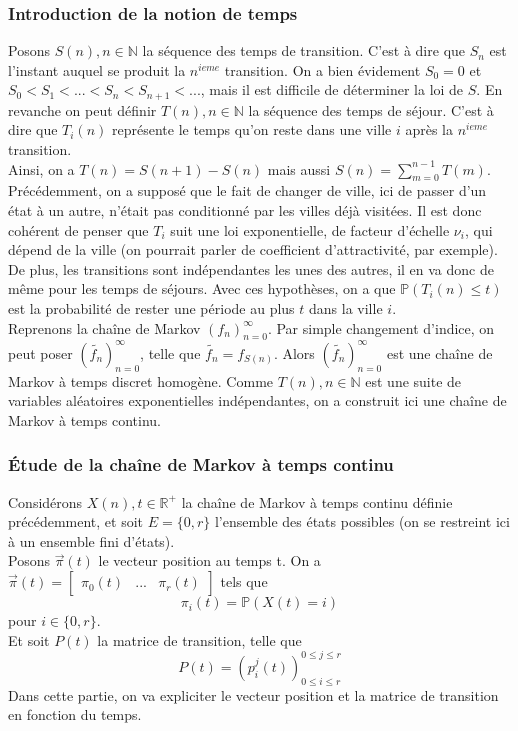 \documentclass[a4paper]{article}
\theoremstyle{plain}
\theoremstyle{definition}
\theoremstyle{remark}
\begin{document}
\subsubsection{Introduction de la notion de temps}
Posons ${S(n), n\in\mathbb{N}}$ la séquence des temps de transition. C'est à dire que $S_n$ est l'instant auquel se produit la $n^{ieme}$ transition. On a bien évidement $S_0=0$ et $S_0<S_1<...<S_n<S_{n+1}<...$, mais il est difficile de déterminer la loi de $S$. En revanche on peut définir ${T(n), n\in\mathbb{N}}$ la séquence des temps de séjour. C'est à dire que $T_i(n)$ représente le temps qu'on reste dans une ville $i$ après la $n^{ieme}$ transition.\\
Ainsi, on a $T(n)=S(n+1)-S(n)$ mais aussi $S(n)=\sum_{m=0}^{n-1}T(m)$.\\
Précédemment, on a supposé que le fait de changer de ville, ici de passer d'un état à un autre, n'était pas conditionné par les villes déjà visitées. Il est donc cohérent de penser que $T_i$ suit une loi exponentielle, de facteur d'échelle $\nu_i$, qui dépend de la ville (on pourrait parler de coefficient d'attractivité, par exemple).\\
De plus, les transitions sont indépendantes les unes des autres, il en va donc de même pour les temps de séjours.
Avec ces hypothèses, on a que $\mathbb{P}(T_i(n)\leqslant t)$ est la probabilité de rester une période au plus $t$ dans la ville $i$.\\
Reprenons la chaîne de Markov $(f_n)_{n=0}^{\infty}$. Par simple changement d'indice, on peut poser $(\tilde{f_n})_{n=0}^{\infty}$, telle que $\tilde{f_n}=f_{S(n)}$. Alors $(\tilde{f_n})_{n=0}^{\infty}$ est une chaîne de Markov à temps discret homogène. Comme ${T(n), n\in\mathbb{N}}$ est une suite de variables aléatoires exponentielles indépendantes, on a construit ici une chaîne de Markov à temps continu.
\subsubsection{Étude de la chaîne de Markov à temps continu}
Considérons ${X(n), t\in\mathbb{R}^+}$ la chaîne de Markov à temps continu définie précédemment, et soit $E=\{0,r\}$ l'ensemble des états possibles (on se restreint ici à un ensemble fini d'états).\\
Posons $\vec{\pi}(t)$ le vecteur position au temps t. On a $\vec{\pi}(t)=\begin{bmatrix}
\pi_0(t)&...&\pi_r(t)
\end{bmatrix} $ tels que $$\pi_i(t)=\mathbb{P}(X(t)=i)$$ pour $i\in\{0,r\}$. \\
Et soit $P(t)$ la matrice de transition, telle que $$P(t)={\left( p_i^j (t) \right) }_{0\leq i\leq r}^{0\leq j\leq r}$$
Dans cette partie, on va expliciter le vecteur position et la matrice de transition en fonction du temps.
\end{document}
